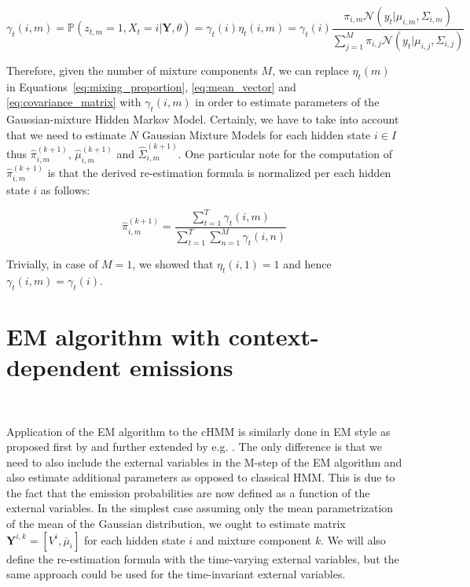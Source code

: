 \begin{equation}
    \gamma_t(i,m) = \mathbb{P}(z_{t,m} = 1, X_t = i|\textbf{Y},\theta) = \gamma_t(i) \eta_t(i,m) = \gamma_t(i) \frac{\pi_{i,m} \mathcal{N}(y_t|\mu_{i,m},\Sigma_{i,m})}{\sum_{j=1}^{M} \pi_{i,j} \mathcal{N}(y_t|\mu_{i,j},\Sigma_{i,j})}
\end{equation}

Therefore, given the number of mixture components $M$, we can replace $\eta_t(m)$ in Equations~\ref{eq:mixing_proportion}, \ref{eq:mean_vector} and \ref{eq:covariance_matrix} 
with $\gamma_t(i,m)$ in order to estimate parameters of the Gaussian-mixture Hidden Markov Model. Certainly, we have to take into account that we need to estimate $N$ Gaussian Mixture Models
for each hidden state $i \in I$ thus $\hat{\pi}_{i,m}^{(k+1)}$, $\hat{\mu}_{i,m}^{(k+1)}$ and $\hat{\Sigma}_{i,m}^{(k+1)}$. One particular note for the computation of $\hat{\pi}_{i,m}^{(k+1)}$ is 
that the derived re-estimation formula is normalized per each hidden state $i$ as follows:

\begin{equation}
    \hat{\pi}_{i,m}^{(k+1)} = \frac{\sum_{t=1}^{T} \gamma_t(i,m)}{\sum_{t=1}^{T} \sum_{n=1}^{M} \gamma_t(i,n)}
\end{equation}

Trivially, in case of $M = 1$, we showed that $\eta_t(i,1) = 1$ and hence $\gamma_t(i,m) = \gamma_t(i)$. 

\section{EM algorithm with context-dependent emissions}~\label{sec:EM-cHMM}

Application of the EM algorithm to the cHMM is similarly done in EM style as proposed first by \citep{Bobick1999} and further extended by e.g. \citep{Radenen2014}. 
The only difference is that we need to also include the external variables in the 
M-step of the EM algorithm and also estimate additional parameters as opposed to classical HMM. This is due to the fact that the emission probabilities
are now defined as a function of the external variables. In the simplest case assuming only the mean parametrization of the mean of the Gaussian distribution,
we ought to estimate matrix $\textbf{Y}^{i,k} = [V^i,\bar{\mu}_i]$ for each hidden state $i$ and mixture component $k$. We will also define the re-estimation formula 
with the time-varying external variables, but the same approach could be used for the time-invariant external variables. \citep{Radenen2014}

